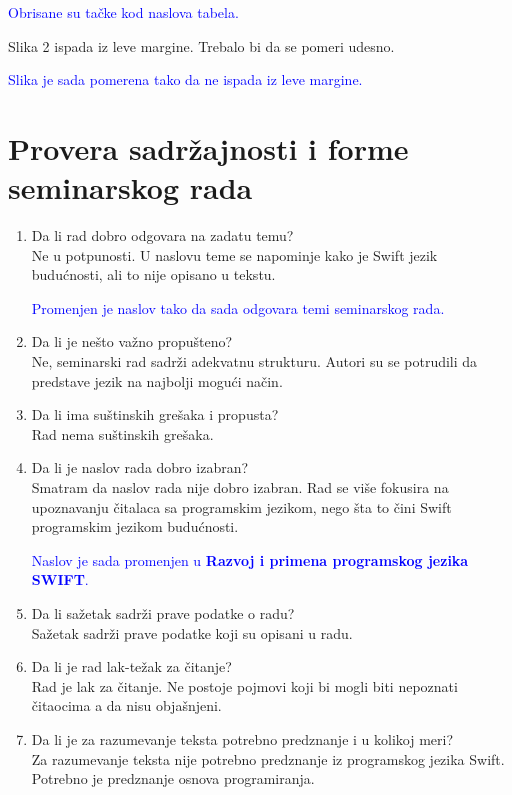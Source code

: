 \documentclass[a4paper]{report}
\newcommand{\odgovor}[1]{\textcolor{blue}{#1}}
\begin{document}
\odgovor{Obrisane su tačke kod naslova tabela.}

Slika 2 ispada iz leve margine. Trebalo bi da se pomeri udesno.

\odgovor{Slika je sada pomerena tako da ne ispada iz leve margine.}

\section{Provera sadržajnosti i forme seminarskog rada}

\begin{enumerate}
\item Da li rad dobro odgovara na zadatu temu?\\
Ne u potpunosti. U naslovu teme se napominje kako je Swift jezik budućnosti, ali to nije opisano u tekstu.

\odgovor{Promenjen je naslov tako da sada odgovara temi seminarskog rada.}

\item Da li je nešto važno propušteno?\\
Ne, seminarski rad sadrži adekvatnu strukturu. Autori su se potrudili da predstave jezik na najbolji mogući način.

\item Da li ima suštinskih grešaka i propusta?\\
Rad nema suštinskih grešaka.

\item Da li je naslov rada dobro izabran?\\
Smatram da naslov rada nije dobro izabran. Rad se više fokusira na upoznavanju čitalaca sa programskim jezikom,
nego šta to čini Swift programskim jezikom budućnosti.

\odgovor{Naslov je sada promenjen u \textbf{Razvoj i primena programskog jezika SWIFT}.}

\item Da li sažetak sadrži prave podatke o radu?\\
Sažetak sadrži prave podatke koji su opisani u radu.

\item Da li je rad lak-težak za čitanje?\\
Rad je lak za čitanje. Ne postoje pojmovi koji bi mogli biti nepoznati čitaocima a da nisu objašnjeni.

\item Da li je za razumevanje teksta potrebno predznanje i u kolikoj meri?\\
Za razumevanje teksta nije potrebno predznanje iz programskog jezika Swift. Potrebno je predznanje osnova programiranja.


\end{enumerate}
\end{document}
